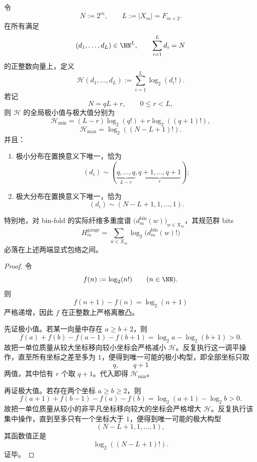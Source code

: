 \begin{theorem}\label{thm:xi-time-part60ab2-gauge-bits-global-extrema}
令
\[
N:=2^m,
\qquad
L:=|X_m|=F_{m+2}.
\]
在所有满足
\[
(d_1,\dots,d_L)\in \NN^{L},
\qquad
\sum_{i=1}^{L}d_i=N
\]
的正整数向量上，定义
\[
\mathcal H(d_1,\dots,d_L):=\sum_{i=1}^{L}\log_2(d_i!).
\]
若记
\[
N=qL+r,
\qquad
0\le r<L,
\]
则 \(\mathcal H\) 的全局极小值与极大值分别为
\[
\mathcal H_{\min}
=(L-r)\log_2(q!)+r\log_2((q+1)!),
\]
\[
\mathcal H_{\max}
=
\log_2((N-L+1)!).
\]
并且：
\begin{enumerate}
  \item 极小分布在置换意义下唯一，恰为
  \[
  (d_i)\sim
  (\underbrace{q,\dots,q}_{L-r},
  \underbrace{q+1,\dots,q+1}_{r});
  \]
  \item 极大分布在置换意义下唯一，恰为
  \[
  (d_i)\sim (N-L+1,1,\dots,1).
  \]
\end{enumerate}
特别地，对 bin-fold 的实际纤维多重度谱 \(\bigl(d_m^{\mathrm{bin}}(w)\bigr)_{w\in X_m}\)，其规范群 bits
\[
H_m^{\mathrm{gauge}}=\sum_{w\in X_m}\log_2\bigl(d_m^{\mathrm{bin}}(w)!\bigr)
\]
必落在上述两端显式包络之间。
\end{theorem}
\begin{proof}
令
\[
f(n):=\log_2(n!)
\qquad (n\in\NN).
\]
则
\[
f(n+1)-f(n)=\log_2(n+1)
\]
严格递增，因此 \(f\) 在正整数上严格离散凸。

先证极小值。若某一向量中存在 \(a\ge b+2\)，则
\[
f(a)+f(b)-f(a-1)-f(b+1)
=
\log_2 a-\log_2(b+1)>0.
\]
故把一单位质量从较大坐标移向较小坐标会严格减小 \(\mathcal H\)。反复执行这一调平操作，直至所有坐标之差至多为 \(1\)，便得到唯一可能的极小构型，即全部坐标只取
\[
q,\qquad q+1
\]
两值，其中恰有 \(r\) 个取 \(q+1\)。代入即得 \(\mathcal H_{\min}\)。

再证极大值。若存在两个坐标 \(a\ge b\ge 2\)，则
\[
f(a+1)+f(b-1)-f(a)-f(b)
=
\log_2(a+1)-\log_2 b>0.
\]
故把一单位质量从较小的非平凡坐标移向较大的坐标会严格增大 \(\mathcal H\)。反复执行该集中操作，直到至多只有一个坐标大于 \(1\)，便得到唯一可能的极大构型
\[
(N-L+1,1,\dots,1),
\]
其函数值正是
\[
\log_2((N-L+1)!).
\]
证毕。
\end{proof}

